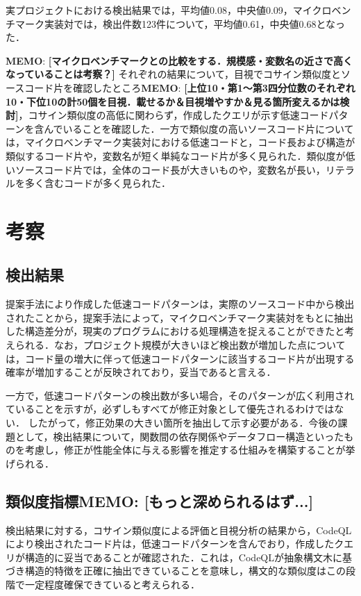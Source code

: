 \documentclass[submit,techrep,noauthor]{ipsj}
\newcommand{\memo}[1]{\colorbox{magenta!30}{{\bf MEMO}:}{\color{red!50} {\textbf{[#1]}}}}
\begin{document}
実プロジェクトにおける検出結果では，平均値0.08，中央値0.09，マイクロベンチマーク実装対では，検出件数123件について，平均値0.61，中央値0.68となった．

\memo{マイクロベンチマークとの比較をする．規模感・変数名の近さで高くなっていることは考察？}
それぞれの結果について，目視でコサイン類似度とソースコード片を確認したところ\memo{上位10・第1〜第3四分位数のそれぞれ10・下位10の計50個を目視．載せるか＆目視増やすか＆見る箇所変えるかは検討}，コサイン類似度の高低に関わらず，作成したクエリが示す低速コードパターンを含んでいることを確認した．一方で類似度の高いソースコード片については，マイクロベンチマーク実装対における低速コードと，コード長および構造が類似するコード片や，変数名が短く単純なコード片が多く見られた．類似度が低いソースコード片では，全体のコード長が大きいものや，変数名が長い，リテラルを多く含むコードが多く見られた．


\section{考察}
\label{sec:discussion}


\subsection{検出結果}

提案手法により作成した低速コードパターンは，実際のソースコード中から検出されたことから，提案手法によって，マイクロベンチマーク実装対をもとに抽出した構造差分が，現実のプログラムにおける処理構造を捉えることができたと考えられる．なお，プロジェクト規模が大きいほど検出数が増加した点については，コード量の増大に伴って低速コードパターンに該当するコード片が出現する確率が増加することが反映されており，妥当であると言える．

一方で，低速コードパターンの検出数が多い場合，そのパターンが広く利用されていることを示すが，必ずしもすべてが修正対象として優先されるわけではない．
したがって，修正効果の大きい箇所を抽出して示す必要がある．今後の課題として，検出結果について，関数間の依存関係やデータフロー構造といったものを考慮し，修正が性能全体に与える影響を推定する仕組みを構築することが挙げられる．

\subsection{類似度指標\memo{もっと深められるはず...}}

検出結果に対する，コサイン類似度による評価と目視分析の結果から，CodeQLにより検出されたコード片は，低速コードパターンを含んでおり，作成したクエリが構造的に妥当であることが確認された．これは，CodeQLが抽象構文木に基づき構造的特徴を正確に抽出できていることを意味し，構文的な類似度はこの段階で一定程度確保できていると考えられる．
\end{document}
